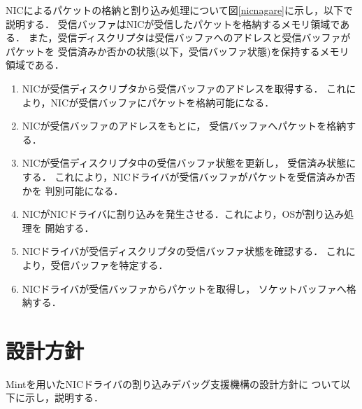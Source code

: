 \documentclass[tanilab-enum]{graduate}
\begin{document}
NICによるパケットの格納と割り込み処理について図\ref{nicnagare}に示し，以下で説明する．
受信バッファはNICが受信したパケットを格納するメモリ領域である．
また，受信ディスクリプタは受信バッファへのアドレスと受信バッファがパケットを
受信済みか否かの状態(以下，受信バッファ状態)を保持するメモリ領域である．
\begin{enumerate}
    \item 
        NICが受信ディスクリプタから受信バッファのアドレスを取得する．
        これにより，NICが受信バッファにパケットを格納可能になる．
    \item 
        NICが受信バッファのアドレスをもとに，
        受信バッファへパケットを格納する．
    \item 
        NICが受信ディスクリプタ中の受信バッファ状態を更新し，
        受信済み状態にする．
        これにより，NICドライバが受信バッファがパケットを受信済みか否かを
        判別可能になる．
    \item 
        NICがNICドライバに割り込みを発生させる．これにより，OSが割り込み処理を
        開始する．
    \item 
        NICドライバが受信ディスクリプタの受信バッファ状態を確認する．
        これにより，受信バッファを特定する．
    \item 
        NICドライバが受信バッファからパケットを取得し，
        ソケットバッファへ格納する．
\end{enumerate}


\section{設計方針}\label{sekkeihousin}
Mintを用いたNICドライバの割り込みデバッグ支援機構の設計方針に
ついて以下に示し，説明する．
\end{document}
